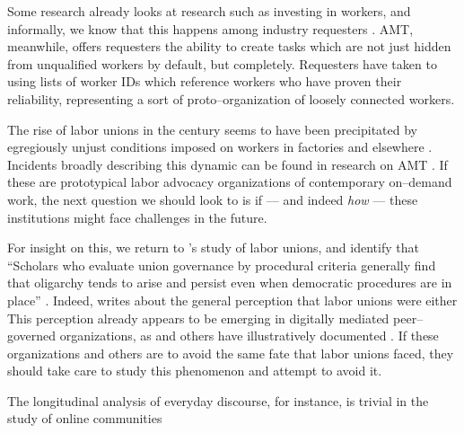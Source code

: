 \documentclass[trackingWork]{subfiles}
\begin{document}
Some research already looks at research such as investing in workers, and
informally, we know that this happens among industry requesters
\cite{jonBrelig,shepherdingDow}.
AMT, meanwhile, offers requesters the ability to create tasks which are
not just hidden from unqualified workers by default, but completely.
Requesters have taken to using lists of worker IDs which reference
workers who have proven their reliability,
representing a sort of proto--organization of loosely connected workers.


\subsubsubsection{\pieceworkpers}
The rise of labor unions in the  century seems to have been precipitated by
egregiously unjust conditions imposed on workers in factories and elsewhere
\cite{ebbinghaus1999institutions}.
Incidents broadly describing this dynamic can be found in research on AMT
\cite{turkopticon,dynamo}.
If these are prototypical labor advocacy organizations of contemporary on--demand work,
the next question we should look to is if
--- and indeed \textit{how} ---
these institutions might face challenges in the future.

For insight on this, we return to \citeyear{levi2009union}'s study of labor unions,
and identify that
``Scholars who evaluate union governance by procedural criteria generally find that oligarchy tends to arise and persist even when democratic procedures are in place''
\cite{levi2009union}.
Indeed, \citeauthor{levi2009union} writes about the general perception that labor unions were either
This perception already appears to be emerging in digitally mediated peer--governed organizations,
as \citeauthor{keegan2010egalitarians} and others have illustratively documented
\cite{beschastnikh2008wikipedian,keegan2010egalitarians}.
If these organizations and others are to avoid the same fate that labor unions faced,
they should take care to study this phenomenon and attempt to avoid it.


\subsubsubsection{\whatchanged}
The longitudinal analysis of everyday discourse, for instance,
is trivial in the study of online communities


\subsubsubsection{\implication}



\onlyinsubfile{
\printbibliography
}
\end{document}
